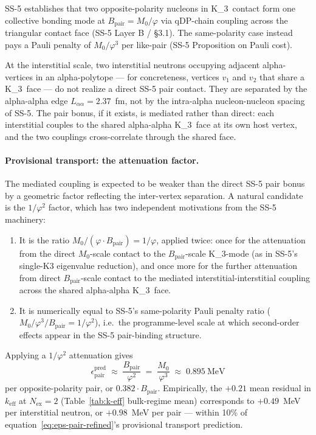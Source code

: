 \documentclass[11pt,letterpaper]{article}
\theoremstyle{definition}
\newcommand{\Mzero}{M_0}
\newcommand{\phig}{\varphi}
\newcommand{\Bpair}{B_{\text{pair}}}
\newcommand{\Nex}{N_{\text{ex}}}
\newcommand{\Kthree}{K_3}
\begin{document}
SS-5 \cite{abshier2026ss5} establishes that two opposite-polarity nucleons in \Kthree\ contact form one collective bonding mode at $\Bpair = \Mzero/\phig$ via qDP-chain coupling across the triangular contact face (SS-5 Layer B / \S3.1). The same-polarity case instead pays a Pauli penalty of $\Mzero/\phig^3$ per like-pair (SS-5 Proposition on Pauli cost).

At the interstitial scale, two interstitial neutrons occupying adjacent alpha-vertices in an alpha-polytope --- for concreteness, vertices $v_1$ and $v_2$ that share a \Kthree\ face --- do not realize a direct SS-5 pair contact. They are separated by the alpha-alpha edge $L_{\alpha\alpha} = 2.37$~fm, not by the intra-alpha nucleon-nucleon spacing of SS-5. The pair bonus, if it exists, is mediated rather than direct: each interstitial couples to the shared alpha-alpha \Kthree\ face at its own host vertex, and the two couplings cross-correlate through the shared face.

\paragraph{Provisional transport: the attenuation factor.}

The mediated coupling is expected to be weaker than the direct SS-5 pair bonus by a geometric factor reflecting the inter-vertex separation. A natural candidate is the $1/\phig^2$ factor, which has two independent motivations from the SS-5 machinery:

\begin{enumerate}
  \item It is the ratio $\Mzero/(\phig \cdot \Bpair) = 1/\phig$, applied twice: once for the attenuation from the direct $\Mzero$-scale contact to the $\Bpair$-scale \Kthree-mode (as in SS-5's single-K3 eigenvalue reduction), and once more for the further attenuation from direct $\Bpair$-scale contact to the mediated interstitial-interstitial coupling across the shared alpha-alpha \Kthree\ face.
  \item It is numerically equal to SS-5's same-polarity Pauli penalty ratio ($\Mzero/\phig^3 / \Bpair = 1/\phig^2$), i.e.\ the programme-level scale at which second-order effects appear in the SS-5 pair-binding structure.
\end{enumerate}

Applying a $1/\phig^2$ attenuation gives
\begin{equation}
  \epsilon_{\text{pair}}^{\text{pred}} \;\approx\; \frac{\Bpair}{\phig^2} \;=\; \frac{\Mzero}{\phig^3} \;\approx\; 0.895~\mathrm{MeV}
  \label{eq:eps-pair-refined}
\end{equation}
per opposite-polarity pair, or $0.382 \cdot \Bpair$. Empirically, the $+0.21$ mean residual in $k_{\text{eff}}$ at $\Nex = 2$ (Table~\ref{tab:k-eff} bulk-regime mean) corresponds to $+0.49$~MeV per interstitial neutron, or $+0.98$~MeV per pair --- within 10\% of equation~\eqref{eq:eps-pair-refined}'s provisional transport prediction.
\end{document}
